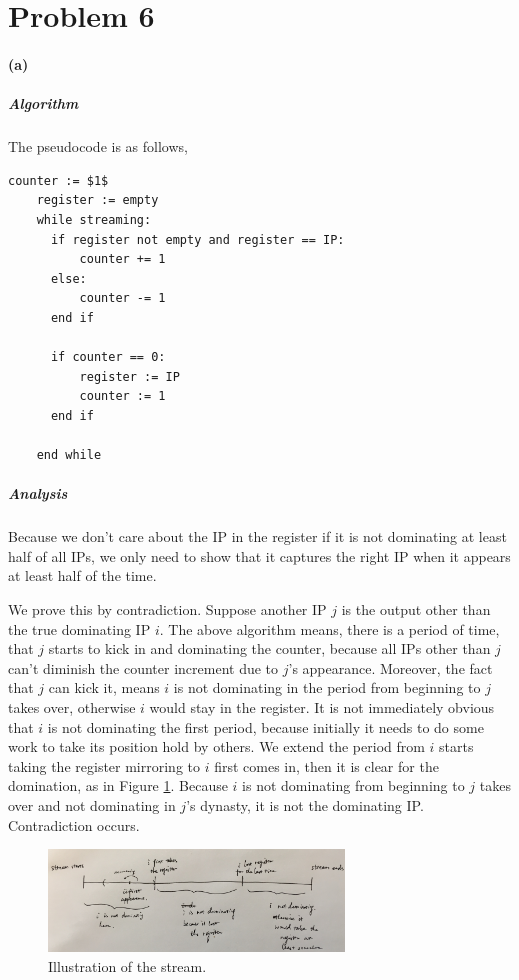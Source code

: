\documentclass[12pt]{article}
\begin{document}
\pagebreak

\section*{Problem 6}
\paragraph{(a)}
\subparagraph{Algorithm} The pseudocode is as follows,
~\\

\begin{lstlisting}[style=customc]
	counter := $1$
	register := empty
	while streaming:
	  if register not empty and register == IP:
	      counter += 1
	  else:
	      counter -= 1
	  end if
	  
	  if counter == 0:
	      register := IP
	      counter := 1		
	  end if
	  
	end while
\end{lstlisting}

\subparagraph{Analysis}

Because we don't care about the IP in the register if it is not dominating at least half of all IPs, we only need to show that it captures the right IP when it appears at least half of the time.

We prove this by contradiction. Suppose another IP $j$ is the output other than the true dominating IP $i$. The above algorithm means, there is a period of time, that $j$ starts to kick in and dominating the counter, because all IPs other than $j$ can't diminish the counter increment due to $j$'s appearance. Moreover, the fact that $j$ can kick it, means $i$ is not dominating in the period from beginning to $j$ takes over, otherwise $i$ would stay in the register. It is not immediately obvious that $i$ is not dominating the first period, because initially it needs to do some work to take its position hold by others. We extend the period from $i$ starts taking the register mirroring to $i$ first comes in, then it is clear for the domination, as in Figure \ref{fig:6-1}. Because $i$ is not dominating from beginning to $j$ takes over and not dominating in $j$'s dynasty, it is not the dominating IP. Contradiction occurs. 
\begin{figure}
	\centering
	\includegraphics[width=0.7\textwidth]{6-1.jpg}
	\caption{Illustration of the stream.} \label{fig:6-1}
	\vspace*{-0.3in}
\end{figure}
\end{document}
